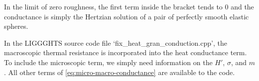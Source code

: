 In the limit of zero roughness, the first term inside the bracket tends to 0 and the conductance is simply the Hertzian solution of a pair of perfectly smooth elastic spheres.

In the LIGGGHTS source code file `fix\_heat\_gran\_conduction.cpp', the macroscopic thermal resistance is incorporated into the heat conductance term. To include the microscopic term, we simply need information on the $H'$, $\sigma$, and $m$. All other terms of \cref{eq:micro-macro-conductance} are available to the code.